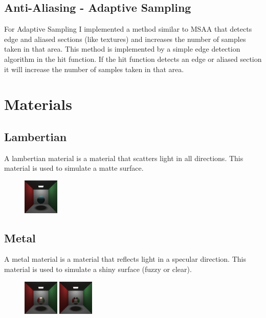 \documentclass{article}
\begin{document}
    \subsection{Anti-Aliasing - Adaptive Sampling}
    For Adaptive Sampling I implemented a method similar to MSAA that detects edge and aliased sections (like textures) and increases the number of samples taken in that area. This method is implemented by a simple edge detection algorithm in the hit function. If the hit function detects an edge or aliased section it will increase the number of samples taken in that area. \par


\section{Materials}



    \subsection{Lambertian}
    A lambertian material is a material that scatters light in all directions. This material is used to simulate a matte surface. \par
    \begin{figure}[h!]
        \centering
        \includegraphics[width=0.15\textwidth]{samples/LambertianSphere.png}
    \end{figure}


    \subsection{Metal}
    A metal material is a material that reflects light in a specular direction. This material is used to simulate a shiny surface (fuzzy or clear). \par
    \begin{figure}[h!]
        \centering
        \includegraphics[width=0.15\textwidth]{samples/MetalSphereFuzz.png}
        \includegraphics[width=0.15\textwidth]{samples/MetalSphereNoFuzz.png}
    \end{figure}
\end{document}
